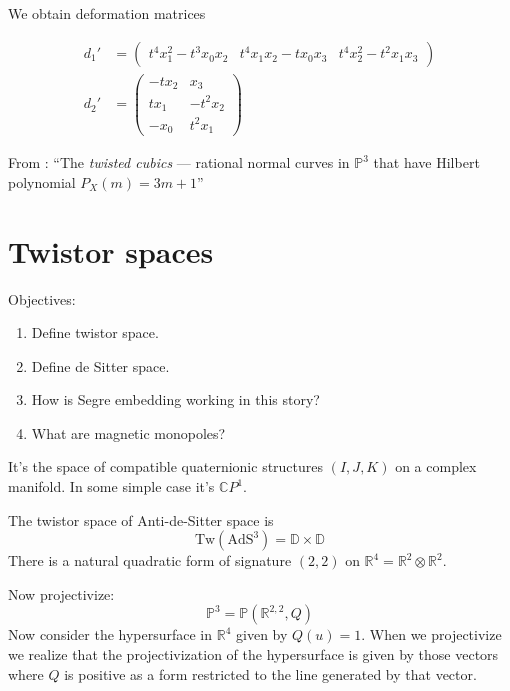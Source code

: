 We obtain deformation matrices

\begin{equation}
\label{equation-deformation-matrices-twisted-cubic}
\begin{aligned}
d_1'&=\begin{pmatrix}
t^4x_1^2-t^3x_0x_2 &
t^4x_1x_2-tx_0x_3 &
t^4x_2^2-t^2x_1x_3
\end{pmatrix}\\
d_2'&=\begin{pmatrix}
-tx_2 & x_3\\
tx_1 & -t^2x_2\\
-x_0 & t^2x_1
\end{pmatrix}
\end{aligned}
\end{equation}

From \cite[p. 10]{HarrMorr}: ``The {\it twisted cubics} --- rational normal
curves in $\mathbb{P}^3$ that have Hilbert polynomial $P_X(m)=3m+1$''

\section{Twistor spaces}
\label{section-twistor-spaces}

Objectives:
\begin{enumerate}
\item Define twistor space.
\item Define de Sitter space.
\item How is Segre embedding working in this story?
\item What are magnetic monopoles?
\end{enumerate}

\begin{definition}
\label{definition-twistor-space}
It's the space of compatible quaternionic structures $(I,J,K)$ on a complex
manifold. In some simple case it's $\mathbb{C}P^{1}$.
\end{definition}

The twistor space of Anti-de-Sitter space is
$$
\text{Tw}(\text{AdS}^3)=\mathbb{D}\times \mathbb{D}
$$
There is a natural quadratic form of signature $(2,2)$ on
$\mathbb{R}^4=\mathbb{R}^2 \otimes \mathbb{R}^2$. 

Now projectivize:
$$
\mathbb{P}^3=\mathbb{P}(\mathbb{R}^{2,2},Q)
$$
Now consider the hypersurface in $\mathbb{R}^4$ given by $Q(u)=1$. When we
projectivize we realize that the projectivization of the hypersurface is given
by those vectors where $Q$ is positive as a form restricted to the line
generated by that vector.

